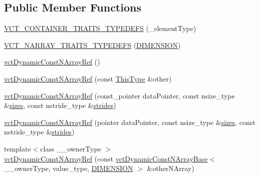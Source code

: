 \subsection*{Public Member Functions}
\begin{DoxyCompactItemize}
\item 
\hyperlink{classvct_dynamic_const_n_array_ref_ad45282f3ed5ad001342d2e2d392fccba}{V\+C\+T\+\_\+\+C\+O\+N\+T\+A\+I\+N\+E\+R\+\_\+\+T\+R\+A\+I\+T\+S\+\_\+\+T\+Y\+P\+E\+D\+E\+F\+S} (\+\_\+element\+Type)
\item 
\hyperlink{classvct_dynamic_const_n_array_ref_afa2332eb9460f2452334228dfa5e0d97}{V\+C\+T\+\_\+\+N\+A\+R\+R\+A\+Y\+\_\+\+T\+R\+A\+I\+T\+S\+\_\+\+T\+Y\+P\+E\+D\+E\+F\+S} (\hyperlink{group__cisst_vector_ggae8d52484153d181fd3ac08be58589848ae003ed9f88ed51f50c6c180506995b93}{D\+I\+M\+E\+N\+S\+I\+O\+N})
\item 
\hyperlink{classvct_dynamic_const_n_array_ref_a8f377039414e0da661472068f1117d01}{vct\+Dynamic\+Const\+N\+Array\+Ref} ()
\item 
\hyperlink{classvct_dynamic_const_n_array_ref_ad88779e4c59e02b0ded5eee8ee9da598}{vct\+Dynamic\+Const\+N\+Array\+Ref} (const \hyperlink{classvct_dynamic_const_n_array_ref_aa156bc5f7cf482d155b45f75c59a3c72}{This\+Type} \&other)
\item 
\hyperlink{classvct_dynamic_const_n_array_ref_a880140c2248e8a95408e9f3bed610cd9}{vct\+Dynamic\+Const\+N\+Array\+Ref} (const\+\_\+pointer data\+Pointer, const nsize\+\_\+type \&\hyperlink{classvct_dynamic_const_n_array_base_aa86793343d80325ba5671bc24a2e0e8f}{sizes}, const nstride\+\_\+type \&\hyperlink{classvct_dynamic_const_n_array_base_a6608baee60a448ccb9598417c487cde2}{strides})
\item 
\hyperlink{classvct_dynamic_const_n_array_ref_a9bb789e4bafc2aed17c9d26b1c60ce0d}{vct\+Dynamic\+Const\+N\+Array\+Ref} (pointer data\+Pointer, const nsize\+\_\+type \&\hyperlink{classvct_dynamic_const_n_array_base_aa86793343d80325ba5671bc24a2e0e8f}{sizes}, const nstride\+\_\+type \&\hyperlink{classvct_dynamic_const_n_array_base_a6608baee60a448ccb9598417c487cde2}{strides})
\item 
{\footnotesize template$<$class \+\_\+\+\_\+owner\+Type $>$ }\\\hyperlink{classvct_dynamic_const_n_array_ref_a7d4185ac0554df97f941adcc87d7b172}{vct\+Dynamic\+Const\+N\+Array\+Ref} (const \hyperlink{classvct_dynamic_const_n_array_base}{vct\+Dynamic\+Const\+N\+Array\+Base}$<$ \+\_\+\+\_\+owner\+Type, value\+\_\+type, \hyperlink{group__cisst_vector_ggae8d52484153d181fd3ac08be58589848ae003ed9f88ed51f50c6c180506995b93}{D\+I\+M\+E\+N\+S\+I\+O\+N} $>$ \&other\+N\+Array)

\end{DoxyCompactItemize}
